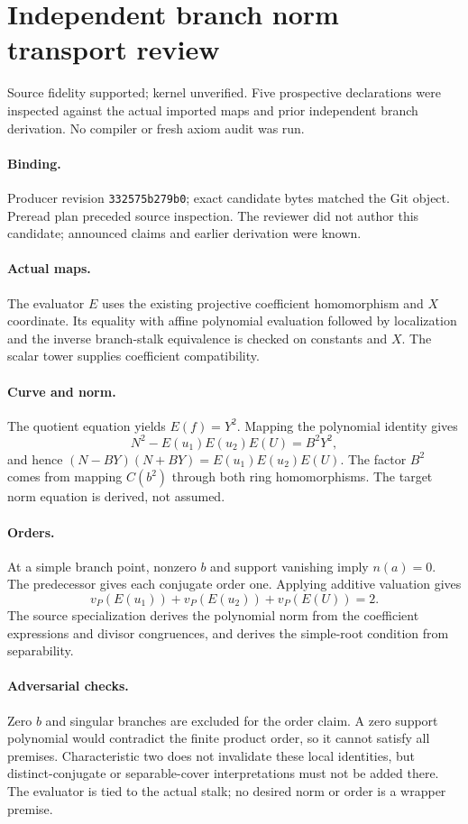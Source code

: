 \documentclass[10pt]{article}
\begin{document}
\section*{Independent branch norm transport review}
Source fidelity supported; kernel unverified. Five prospective declarations were inspected against the actual imported maps and prior independent branch derivation. No compiler or fresh axiom audit was run.
\paragraph{Binding.} Producer revision \texttt{332575b279b0}; exact candidate bytes matched the Git object. Preread plan preceded source inspection. The reviewer did not author this candidate; announced claims and earlier derivation were known.
\paragraph{Actual maps.} The evaluator $E$ uses the existing projective coefficient homomorphism and $X$ coordinate. Its equality with affine polynomial evaluation followed by localization and the inverse branch-stalk equivalence is checked on constants and $X$. The scalar tower supplies coefficient compatibility.
\paragraph{Curve and norm.} The quotient equation yields $E(f)=Y^2$. Mapping the polynomial identity gives
\[N^2-E(u_1)E(u_2)E(U)=B^2Y^2,\]
and hence $(N-BY)(N+BY)=E(u_1)E(u_2)E(U)$. The factor $B^2$ comes from mapping $C(b^2)$ through both ring homomorphisms. The target norm equation is derived, not assumed.
\paragraph{Orders.} At a simple branch point, nonzero $b$ and support vanishing imply $n(a)=0$. The predecessor gives each conjugate order one. Applying additive valuation gives
\[v_P(E(u_1))+v_P(E(u_2))+v_P(E(U))=2.\]
The source specialization derives the polynomial norm from the coefficient expressions and divisor congruences, and derives the simple-root condition from separability.
\paragraph{Adversarial checks.} Zero $b$ and singular branches are excluded for the order claim. A zero support polynomial would contradict the finite product order, so it cannot satisfy all premises. Characteristic two does not invalidate these local identities, but distinct-conjugate or separable-cover interpretations must not be added there. The evaluator is tied to the actual stalk; no desired norm or order is a wrapper premise.
\end{document}
